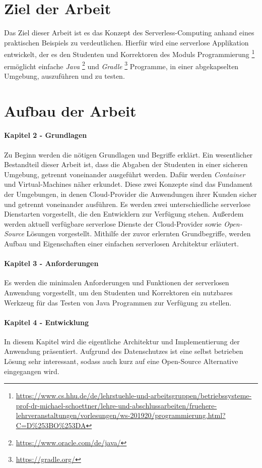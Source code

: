 \section{Ziel der Arbeit}
Das Ziel dieser Arbeit ist es das Konzept des Serverless-Computing anhand eines praktischen
Beispiels zu verdeutlichen. Hierfür wird eine serverlose Applikation entwickelt,
der es den Studenten und Korrektoren des Moduls Programmierung
\footnote{\url{https://www.cs.hhu.de/de/lehrstuehle-und-arbeitsgruppen/betriebssysteme-prof-dr-michael-schoettner/lehre-und-abschlussarbeiten/fruehere-lehrveranstaltungen/vorlesungen/ws-201920/programmierung.html?C=D\%253BO\%253DA}}
ermöglicht einfache \textit{Java} \footnote{\url{https://www.oracle.com/de/java/}}
und \textit{Gradle} \footnote{\url{https://gradle.org/}} Programme, in einer
abgekapselten Umgebung, auszuführen und zu testen.

\section{Aufbau der Arbeit}
\paragraph{Kapitel 2 - Grundlagen} Zu Beginn werden die nötigen Grundlagen und Begriffe erklärt.
Ein wesentlicher Bestandteil dieser Arbeit ist, dass die Abgaben der Studenten in einer sicheren Umgebung,
getrennt voneinander ausgeführt werden. Dafür werden \textit{Container} \cite{Docker} und Virtual-Machines 
näher erkundet. Diese zwei Konzepte sind das Fundament der Umgebungen, in denen Cloud-Provider die 
Anwendungen ihrer Kunden sicher und getrennt voneinander ausführen.
Es werden zwei unterschiedliche serverlose Dienstarten vorgestellt, die den Entwicklern zur Verfügung stehen.
Außerdem werden aktuell verfügbare serverlose Dienste der Cloud-Provider sowie \textit{Open-Source} 
Lösungen vorgestellt. Mithilfe der zuvor erlernten Grundbegriffe, werden Aufbau und 
Eigenschaften einer einfachen serverlosen Architektur erläutert.

\paragraph{Kapitel 3 - Anforderungen} Es werden die minimalen Anforderungen und Funktionen
der serverlosen Anwendung vorgestellt, um den Studenten und Korrektoren ein nutzbares Werkzeug
für das Testen von Java Programmen zur Verfügung zu stellen.

\paragraph{Kapitel 4 - Entwicklung} In diesem Kapitel wird die eigentliche Architektur
und Implementierung der Anwendung präsentiert. Aufgrund des Datenschutzes ist eine
selbst betrieben Lösung sehr interessant, sodass auch kurz auf eine Open-Source Alternative eingegangen wird.

